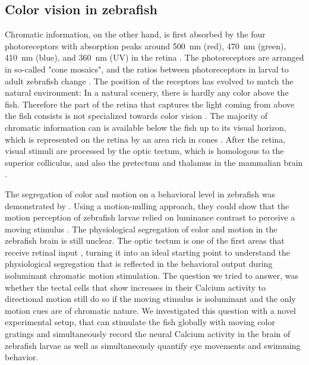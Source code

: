 \subsection{Color vision in zebrafish}

Chromatic information, on the other hand, is first absorbed by the four photoreceptors with absorption peaks around \SI{500}{\nano\meter} (red), \SI{470}{\nano\meter} (green), \SI{410}{\nano\meter} (blue), and \SI{360}{\nano\meter} (UV) in the retina \parencite{robinson1993zebrafish}. The photoreceptors are arranged in so-called "cone mosaics", and the ratios between photoreceptors in larval to adult zebrafish change \parencite{allison2010ontogeny}. The position of the receptors has evolved to match the natural environment: In  a natural scenery, there is hardly any color above the fish. Therefore the part of the retina that captures the light coming from above the fish consists is not specialized towards color vision \parencite{zimmermannZebrafishDifferentiallyProcess2018}. The majority of chromatic information can is available below the fish up to its visual horizon, which is represented on the retina by an area rich in cones \parencite{zimmermannZebrafishDifferentiallyProcess2018}. After the retina, visual stimuli are processed by the optic tectum, which is homologous to the superior colliculus, and also the pretectum and thalamus in the mammalian brain \parencite{bollmannZebrafishVisualSystem2019}. 

\vspace{\baselineskip}

The segregation of color and motion on a behavioral level in zebrafish was demonstrated by \textcite{orgerChannelingRedGreen2005}. Using a motion-nulling approach, they could show that the motion perception of zebrafish larvae relied on luminance contrast to perceive a moving stimulus \parencite{chichilniskyFunctionalSegregationColor1993}. The physiological segregation of color and motion in the zebrafish brain is still unclear. The optic tectum is one of the first areas that receive retinal input \parencite{bollmannZebrafishVisualSystem2019}, turning it into an ideal starting point to understand the physiological segregation that is reflected in the behavioral output during isoluminant chromatic motion stimulation. The question we tried to answer, was whether the tectal cells that show increases in their Calcium activity to directional motion still do so if the moving stimulus is isoluminant and the only motion cues are of chromatic nature. We investigated this question with a novel experimental setup, that can stimulate the fish globally with moving color gratings and simultaneously record  the neural Calcium activity in the brain of zebrafish larvae as well as simultaneously quantify eye movements and swimming behavior. 
